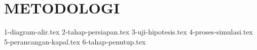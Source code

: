 \chapter{METODOLOGI}
\label{chap:metodologi}

{1-diagram-alir.tex}
{2-tahap-persiapan.tex}
{3-uji-hipotesis.tex}
{4-proses-simulasi.tex}
{5-perancangan-kapal.tex}
{6-tahap-penutup.tex}
